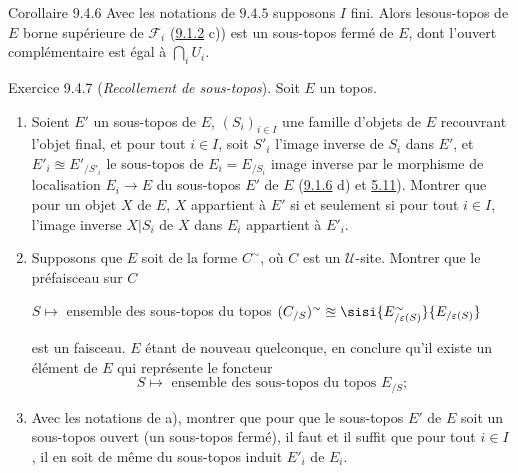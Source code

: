 \documentclass[10pt]{../fichiers-configuration-latex/smfart}
\begin{document}
\begin{enonce*}{Corollaire 9.4.6}
Avec les notations de  $9.4.5$ supposons $I$ fini. Alors
le\pageoriginale sous-topos de $E$ borne supérieure de $\mathcal{F}_{i}$ {\rm
(\hyperref[IV.rem9.1.2]{9.1.2} c))} est un sous-topos fermé de $E$, dont
l'ouvert complémentaire est égal à $\bigcap_i U_i$.
\end{enonce*}

\begin{enonce*}[remark]{Exercice 9.4.7}
(\emph{Recollement de sous-topos}). Soit $E$ un topos.
\begin{enumerate}
\renewcommand{\theenumi}{\alph{enumi}}
\renewcommand{\labelenumi}{\theenumi)}
\item Soient $E'$ un sous-topos de $E$, $(S_i)_{i\in I}$ une famille
d'objets de $E$ recouvrant l'objet final, et pour tout $i\in I$,
soit $S'_i$ l'image inverse de $S_i$ dans $E'$, et $E'_i\approxeq
E'_{/S'_i}$ le sous-topos de $E_i=E_{/S_i}$ image inverse par le
morphisme de localisation $E_i\rightarrow E$ du sous-topos $E'$ de
$E$ (\hyperref[IV.exer9.1.6]{9.1.6} d) et \hyperref[IV.prop5.11]{5.11}). Montrer que pour
un objet $X$ de $E$, $X$ appartient à $E'$ si et seulement si pour
tout $i\in I$, l'image inverse $X| S_i$ de $X$ dans $E_i$ appartient
à $E'_i$.

\item Supposons que $E$ soit de la forme $C^{\sim}$, où $C$ est un
$𝒰$-site. Montrer que le préfaisceau sur $C$
\begin{center}
$S\mapsto$ ensemble des sous-topos du topos
$(C_{/S})^{\sim}\approxeq \sisi{E^{\sim}_{/\varepsilon(S)}}{E_{/\varepsilon(S)}}$
\end{center}
est un faisceau. $E$ étant de nouveau quelconque, en conclure qu'il
existe un élément de $E$ qui représente le foncteur
$$
\text{$S\mapsto$ ensemble des sous-topos du topos $E_{/S}$;}
$$

\item Avec les notations de a), montrer que pour que le sous-topos
$E'$ de $E$ soit un sous-topos ouvert (\resp un sous-topos fermé),
il faut et il suffit que pour tout $i\in I$, il en soit de même du
sous-topos induit $E'_i$ de $E_i$.
\end{enumerate}
\end{enonce*}
\end{document}
